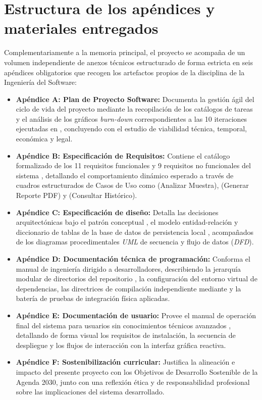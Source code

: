\section{Estructura de los apéndices y materiales entregados}

Complementariamente a la memoria principal, el proyecto se acompaña de un volumen independiente de anexos técnicos estructurado de forma estricta en seis apéndices obligatorios que recogen los artefactos propios de la disciplina de la Ingeniería del Software:

\begin{itemize}
    \item \textbf{Apéndice A: Plan de Proyecto Software:} Documenta la gestión ágil del ciclo de vida del proyecto mediante la recopilación de los catálogos de tareas y el análisis de los gráficos \textit{burn-down} correspondientes a las 10 iteraciones ejecutadas en  , concluyendo con el estudio de viabilidad técnica, temporal, económica y legal.
    \item \textbf{Apéndice B: Especificación de Requisitos:} Contiene el catálogo formalizado de los 11 requisitos funcionales y 9 requisitos no funcionales del sistema , detallando el comportamiento dinámico esperado a través de cuadros estructurados de Casos de Uso como  (Analizar Muestra),  (Generar Reporte PDF) y  (Consultar Histórico).
    \item \textbf{Apéndice C: Especificación de diseño:} Detalla las decisiones arquitectónicas bajo el patrón conceptual  , el modelo entidad-relación y diccionario de tablas de la base de datos de persistencia local , acompañados de los diagramas procedimentales \textit{UML} de secuencia y flujo de datos (\textit{DFD}).
    \item \textbf{Apéndice D: Documentación técnica de programación:} Conforma el manual de ingeniería dirigido a desarrolladores, describiendo la jerarquía modular de directorios del repositorio , la configuración del entorno virtual de dependencias, las directrices de compilación independiente mediante   y la batería de pruebas de integración física aplicadas.
    \item \textbf{Apéndice E: Documentación de usuario:} Provee el manual de operación final del sistema para usuarios sin conocimientos técnicos avanzados , detallando de forma visual los requisitos de instalación, la secuencia de despliegue y los flujos de interacción con la interfaz gráfica reactiva.
\item \textbf{Apéndice F: Sostenibilización curricular:} Justifica la alineación e impacto del presente proyecto con los Objetivos de Desarrollo Sostenible de la Agenda 2030, junto con una reflexión ética y de responsabilidad profesional sobre las implicaciones del sistema desarrollado.
\end{itemize}

